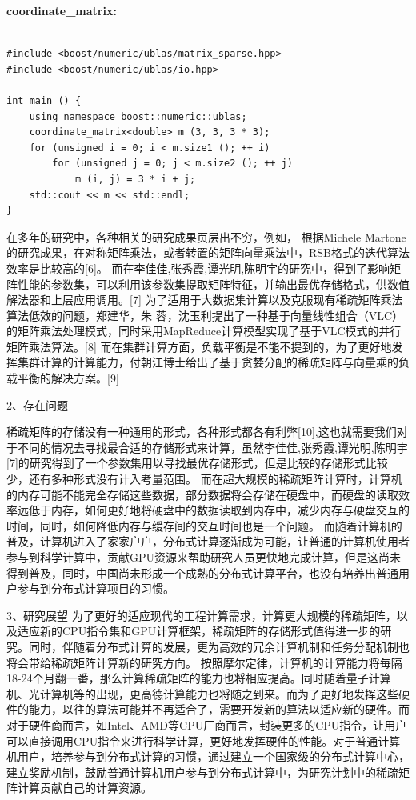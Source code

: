 \documentclass{article}
\begin{document}
\textbf{coordinate\_matrix:}
\begin{lstlisting}

#include <boost/numeric/ublas/matrix_sparse.hpp>
#include <boost/numeric/ublas/io.hpp>

int main () {
    using namespace boost::numeric::ublas;
    coordinate_matrix<double> m (3, 3, 3 * 3);
    for (unsigned i = 0; i < m.size1 (); ++ i)
        for (unsigned j = 0; j < m.size2 (); ++ j)
            m (i, j) = 3 * i + j;
    std::cout << m << std::endl;
}
\end{lstlisting}

在多年的研究中，各种相关的研究成果页层出不穷，例如，
根据Michele Martone的研究成果，在对称矩阵乘法，或者转置的矩阵向量乘法中，RSB格式的迭代算法效率是比较高的[6]。
而在李佳佳,张秀霞,谭光明,陈明宇的研究中，得到了影响矩阵性能的参数集，可以利用该参数集提取矩阵特征，并输出最优存储格式，供数值解法器和上层应用调用。[7]
为了适用于大数据集计算以及克服现有稀疏矩阵乘法算法低效的问题，郑建华，朱 蓉，沈玉利提出了一种基于向量线性组合（VLC）的矩阵乘法处理模式，同时采用MapReduce计算模型实现了基于VLC模式的并行矩阵乘法算法。[8]
而在集群计算方面，负载平衡是不能不提到的，为了更好地发挥集群计算的计算能力，付朝江博士给出了基于贪婪分配的稀疏矩阵与向量乘的负载平衡的解决方案。[9]
\newline

2、存在问题\newline

稀疏矩阵的存储没有一种通用的形式，各种形式都各有利弊[10],这也就需要我们对于不同的情况去寻找最合适的存储形式来计算，虽然李佳佳,张秀霞,谭光明,陈明宇[7]的研究得到了一个参数集用以寻找最优存储形式，但是比较的存储形式比较少，还有多种形式没有计入考量范围。
\newline
而在超大规模的稀疏矩阵计算时，计算机的内存可能不能完全存储这些数据，部分数据将会存储在硬盘中，而硬盘的读取效率远低于内存，如何更好地将硬盘中的数据读取到内存中，减少内存与硬盘交互的时间，同时，如何降低内存与缓存间的交互时间也是一个问题。
\newline
而随着计算机的普及，计算机进入了家家户户，分布式计算逐渐成为可能，让普通的计算机使用者参与到科学计算中，贡献GPU资源来帮助研究人员更快地完成计算，但是这尚未得到普及，同时，中国尚未形成一个成熟的分布式计算平台，也没有培养出普通用户参与到分布式计算项目的习惯。\newline



3、研究展望\newline
为了更好的适应现代的工程计算需求，计算更大规模的稀疏矩阵，以及适应新的CPU指令集和GPU计算框架，稀疏矩阵的存储形式值得进一步的研究。同时，伴随着分布式计算的发展，更为高效的冗余计算机制和任务分配机制也将会带给稀疏矩阵计算新的研究方向。
按照摩尔定律，计算机的计算能力将毎隔18-24个月翻一番，那么计算稀疏矩阵的能力也将相应提高。同时随着量子计算机、光计算机等的出现，更高德计算能力也将随之到来。而为了更好地发挥这些硬件的能力，以往的算法可能并不再适合了，需要开发新的算法以适应新的硬件。而对于硬件商而言，如Intel、AMD等CPU厂商而言，封装更多的CPU指令，让用户可以直接调用CPU指令来进行科学计算，更好地发挥硬件的性能。对于普通计算机用户，培养参与到分布式计算的习惯，通过建立一个国家级的分布式计算中心，建立奖励机制，鼓励普通计算机用户参与到分布式计算中，为研究计划中的稀疏矩阵计算贡献自己的计算资源。\newline
\end{document}
